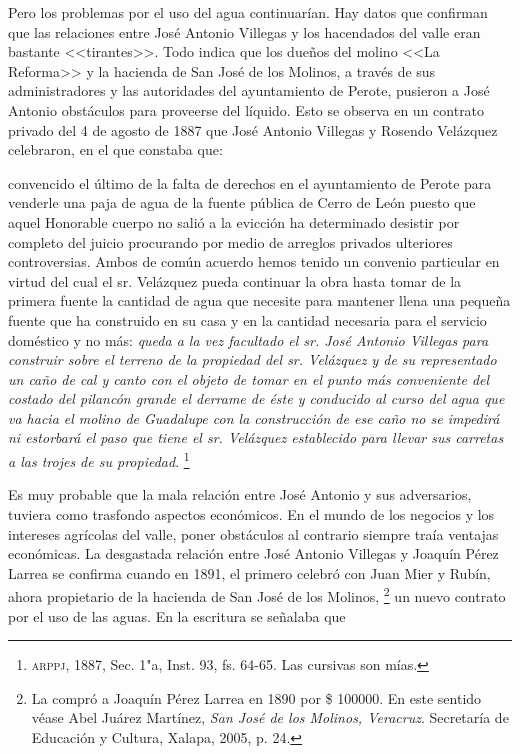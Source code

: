 \documentclass[14pt,twoside,final]{extbook} %
\let\oldfootnote\footnote
\renewcommand\footnote[1]{%
\oldfootnote{\hspace{1mm}#1}}
\begin{document}
Pero los problemas por el uso del agua continuarían. Hay datos que confirman que las relaciones entre José Antonio Villegas y los hacendados del valle eran bastante <<tirantes>>. Todo indica que los dueños del molino <<La Reforma>> y la hacienda de San José de los Molinos, a través de sus administradores y las autoridades del ayuntamiento de Perote, pusieron a José Antonio obstáculos para proveerse del líquido. Esto se observa en un contrato privado del 4 de agosto de 1887 que José Antonio Villegas y Rosendo Velázquez celebraron, en el que constaba que:
\begin{quoting}
convencido el último de la falta de derechos en el ayuntamiento de Perote para venderle una paja de agua de la fuente pública de Cerro de León puesto que aquel Honorable cuerpo no salió a la evicción ha determinado desistir por completo del juicio procurando por medio de arreglos privados ulteriores controversias. Ambos de común acuerdo hemos tenido un convenio particular en virtud del cual el sr. Velázquez pueda continuar la obra hasta tomar de la primera fuente la cantidad de agua que necesite para mantener llena una pequeña fuente que ha construido en su casa y en la cantidad necesaria para el servicio doméstico y no más: \emph{queda a la vez facultado el sr. José Antonio Villegas para construir sobre el terreno de la propiedad del sr. Velázquez y de su representado un caño de cal y canto con el objeto de tomar en el punto más conveniente del costado del pilancón grande el derrame de éste y conducido al curso del agua que va hacia el molino de Guadalupe con la construcción de ese caño no se impedirá ni estorbará el paso que tiene el sr. Velázquez establecido para llevar sus carretas a las trojes de su propiedad}.\footnote{\textsc{arppj}, 1887, Sec. 1"a, Inst. 93, fs. 64-65. Las cursivas son mías.}
\end{quoting}
Es muy probable que la mala relación entre José Antonio y sus adversarios, tuviera como trasfondo aspectos económicos. En el mundo de los negocios y los intereses agrícolas del valle, poner obstáculos al contrario siempre traía ventajas económicas. La desgastada relación entre José Antonio Villegas y Joaquín Pérez Larrea se confirma cuando en 1891, el primero celebró con Juan Mier y Rubín, ahora propietario de la hacienda de San José de los Molinos,\footnote{La compró a Joaquín Pérez Larrea en 1890 por \$ 100000. En este sentido véase Abel Juárez Martínez, \emph{San José de los Molinos, Veracruz}. Secretaría de Educación y Cultura, Xalapa, 2005, p. 24.} un nuevo contrato por el uso de las aguas. En la escritura se señalaba que
\end{document}
